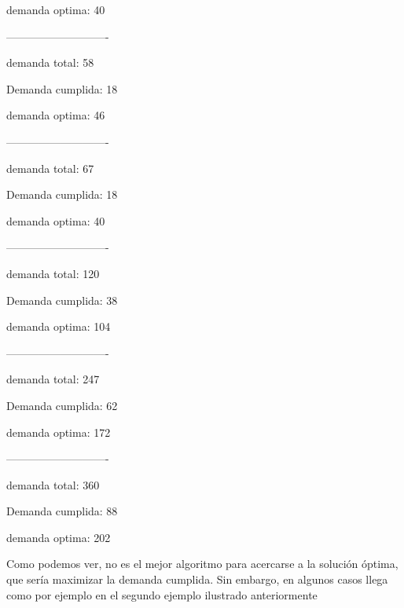 demanda optima: 40

----------------------------

demanda total:  58

Demanda cumplida:  18

demanda optima: 46

----------------------------

demanda total:  67

Demanda cumplida:  18

demanda optima: 40

----------------------------

demanda total:  120

Demanda cumplida:  38

demanda optima: 104

----------------------------

demanda total:  247

Demanda cumplida:  62

demanda optima: 172

----------------------------

demanda total:  360

Demanda cumplida:  88

demanda optima: 202

Como podemos ver, no es el mejor algoritmo para acercarse a la solución óptima, que sería maximizar la demanda cumplida. Sin embargo, en algunos casos llega como por ejemplo en el segundo ejemplo ilustrado anteriormente
